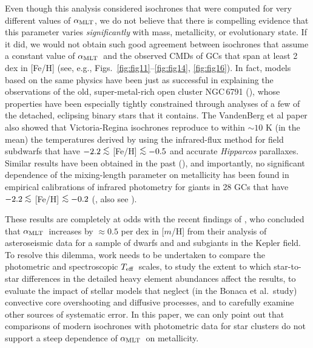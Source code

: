 \documentclass[12pt,preprint]{aastex}
\newcommand\teff{{T_{\rm eff}}}
\newcommand\amlt{{\alpha_{\rm MLT}}}
\newcommand\lta{\mathrel{\hbox{\raise 0.6 ex \hbox{$<$}\kern
                   -1.8 ex\lower .5 ex\hbox{$\sim$}}}}
\begin{document}
Even though this analysis considered isochrones that were computed for very
different values of $\amlt$, we do not believe that there is
compelling evidence that this parameter varies {\it significantly} with mass,
metallicity, or evolutionary state.  If it did, we would not obtain such good
agreement between isochrones that assume a constant value of $\amlt$\ and
the observed CMDs of GCs that span at least 2 dex in [Fe/H] (see, e.g.,
Figs.~\ref{fig:fig11}--\ref{fig:fig14}, \ref{fig:fig16}).  In fact, models based
on the same physics have been just as successful in explaining the observations
of the old, super-metal-rich open cluster NGC$\,$6791 (\citealt{bvb12}),
whose properties have been especially tightly constrained through analyses of a
few of the detached, eclipsing binary stars that it contains.  The VandenBerg
et al paper also showed that Victoria-Regina isochrones reproduce to within 
$\sim 10$ K (in the mean) the temperatures derived by \citet{crm10} using the
infrared-flux method for field subdwarfs that have $-2.2 \lta$ [Fe/H] $\lta
-0.5$ and accurate {\it Hipparcos} parallaxes.  Similar results have been
obtained in the past (\citealt{vbd06}), and importantly, no significant
dependence of the mixing-length parameter on metallicity has been found in
empirical calibrations of infrared photometry for giants in 28 GCs that have
$-2.2 \lta$ [Fe/H] $\lta -0.2$ (\citealt{fvs06}, also see \citealt{pps02}).

These results are completely at odds with the recent findings of
\citet[also see \citealt{bvc12}]{btb12}, who concluded that $\amlt$\ increases
by $\approx 0.5$ per dex in [$m$/H] from their analysis of
asteroseismic data for a sample of dwarfs and and subgiants in the Kepler field.
To resolve this dilemma, work needs to be undertaken to compare the photometric
and spectroscopic $\teff$\ scales, to study the extent to which star-to-star
differences in the detailed heavy element abundances affect the results, to
evaluate the impact of stellar models that neglect (in the Bonaca et al.~study)
convective core overshooting and diffusive processes, and to carefully examine
other sources of systematic error.  In this paper, we can only point out that
comparisons of modern isochrones with photometric data for star clusters do not
support a steep dependence of $\amlt$\ on metallicity.
\end{document}
